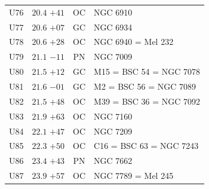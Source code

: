 \begin{table}[t]
\begin{tabularx}{\linewidth}{lccX}
U76  &$20.4$ $+41$&OC &NGC 6910\\
U77  &$20.6$ $+07$&GC &NGC 6934\\
U78  &$20.6$ $+28$&OC &NGC 6940 = Mel 232\\
U79  &$21.1$ $-11$&PN &NGC 7009\\
U80  &$21.5$ $+12$&GC &M15 = BSC 54 = NGC 7078\\
U81  &$21.6$ $-01$&GC &M2 = BSC 56 = NGC 7089\\
U82  &$21.5$ $+48$&OC &M39 = BSC 36 = NGC 7092\\
U83  &$21.9$ $+63$&OC &NGC 7160\\
U84  &$22.1$ $+47$&OC &NGC 7209\\
U85  &$22.3$ $+50$&OC &C16 = BSC 63 = NGC 7243\\
U86  &$23.4$ $+43$&PN &NGC 7662\\
U87  &$23.9$ $+57$&OC &NGC 7789 = Mel 245\\

        \hline
    \end{tabularx}
\end{table}
\clearpage

